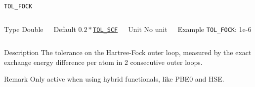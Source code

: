 \begin{frame}[allowframebreaks]{\texttt{TOL\_FOCK}} \label{TOL_FOCK}
\vspace*{-12pt}
\begin{columns}
\begin{block}{Type}
Double
\end{block}

\begin{block}{Default}
$0.2*$\hyperlink{TOL_SCF}{\texttt{TOL\_SCF}}
\end{block}

\begin{block}{Unit}
No unit
\end{block}

\begin{block}{Example}
\texttt{TOL\_FOCK}: 1e-6
\end{block}
\end{columns}

\begin{block}{Description}
The tolerance on the Hartree-Fock outer loop, measured by the exact exchange energy difference per atom in 2 consecutive outer loops.
\end{block}

\begin{block}{Remark}
Only active when using hybrid functionals, like PBE0 and HSE. 
\end{block}

\end{frame}



